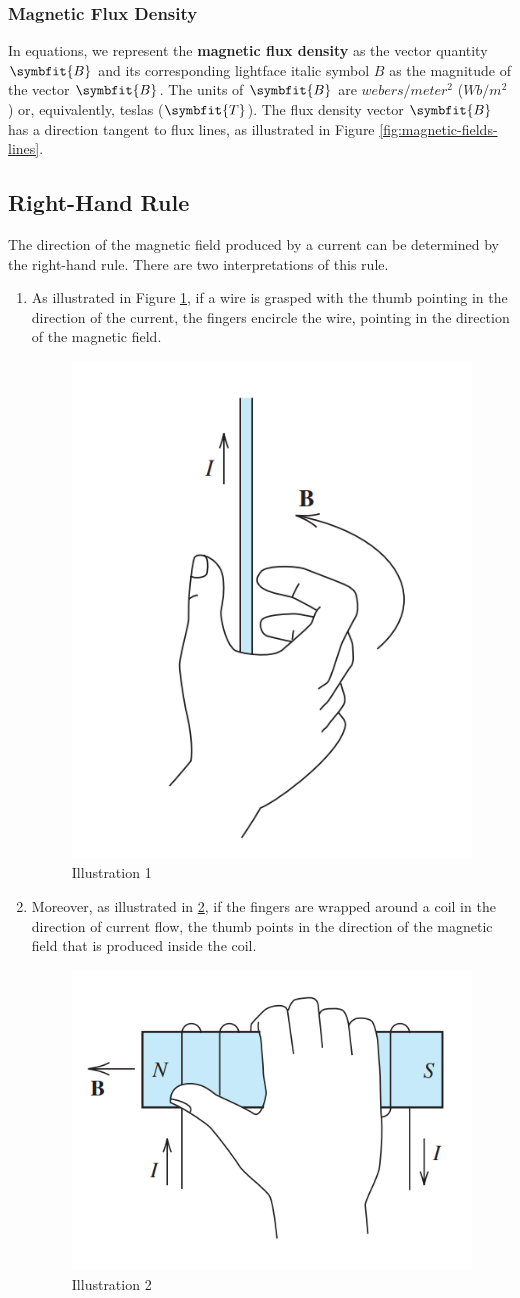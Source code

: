 \documentclass[math,code]{amznotes}
\theoremstyle{remark}
\begin{document}
\subsubsection{Magnetic Flux Density}
In equations, we represent the \textbf{magnetic flux density} as the vector quantity $\symbfit{B}$ and its corresponding lightface italic symbol $\textit{B}$ as the magnitude of the vector $\symbfit{B}$. The units of $\symbfit{B}$ are $webers/{meter}^2$ ($Wb/m^2$) or, equivalently, teslas ($\symbfit{T}$). The flux density vector $\symbfit{B}$ has a direction tangent to flux lines, as illustrated in Figure \ref{fig:magnetic-fields-lines}.
\subsection{Right-Hand Rule}
The direction of the magnetic field produced by a current can be determined by the right-hand rule. There are two interpretations of this rule.
\begin{enumerate}
    \item As illustrated in Figure \ref{fig:right-hand-rule-1}, if a wire is grasped with the thumb pointing in the direction of the current, the fingers encircle the wire, pointing in the direction of the magnetic field.
    \begin{figure}[H]
        \centering
        \includegraphics[width=0.3\linewidth]{images/right-hand-rule-1.png}
        \caption{Illustration 1}
        \label{fig:right-hand-rule-1}
    \end{figure}
    \item Moreover, as illustrated in \ref{fig:right-hand-rule-2}, if the fingers are wrapped around a coil in the direction of current flow, the thumb points in the direction of the magnetic field that is produced inside the coil.
    \begin{figure}[H]
        \centering
        \includegraphics[width=0.3\linewidth]{images/right-hand-rule-2.png}
        \caption{Illustration 2}
        \label{fig:right-hand-rule-2}
    \end{figure}
\end{enumerate}
\end{document}
